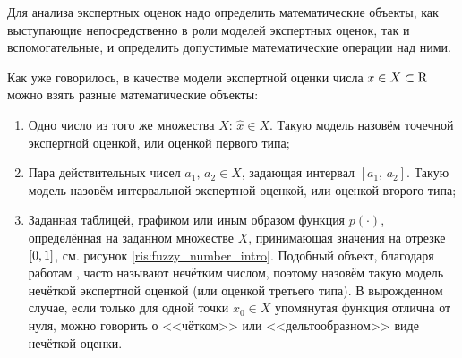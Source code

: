 
\label{sec:math_methods_global}


Для анализа экспертных оценок надо определить математические объекты, как выступающие непосредственно в роли моделей экспертных оценок, так и вспомогательные, и определить допустимые математические операции над ними. 

Как уже говорилось, в качестве модели экспертной оценки числа $x \in X \subset {\mathrm{R}}$ можно взять разные математические объекты: %
\begin{enumerate}
  \item Одно число из того же множества $X$: $\hat{x} \in X$. Такую модель назовём точечной экспертной оценкой, или оценкой первого типа;
  \item Пара действительных чисел $a_1,\, a_2 \in X$, задающая интервал $[a_1,\, a_2]$. Такую модель назовём интервальной экспертной оценкой, или оценкой второго типа;
  \item Заданная таблицей, графиком или иным образом функция $p(\cdot)$, определённая на заданном множестве $X$, принимающая значения на отрезке $[0,1]$, см. рисунок \ref{ris:fuzzy_number_intro}.  Подобный объект, благодаря работам \cite{citeZadeh, dubois_prade-1990}, часто называют нечётким числом, поэтому назовём такую модель нечёткой экспертной оценкой (или оценкой третьего типа). В вырожденном случае, если только для одной точки $x_0 \in X$ упомянутая функция отлична от нуля, можно говорить о <<чётком>> или <<дельтообразном>> виде нечёткой оценки.
\end{enumerate}

